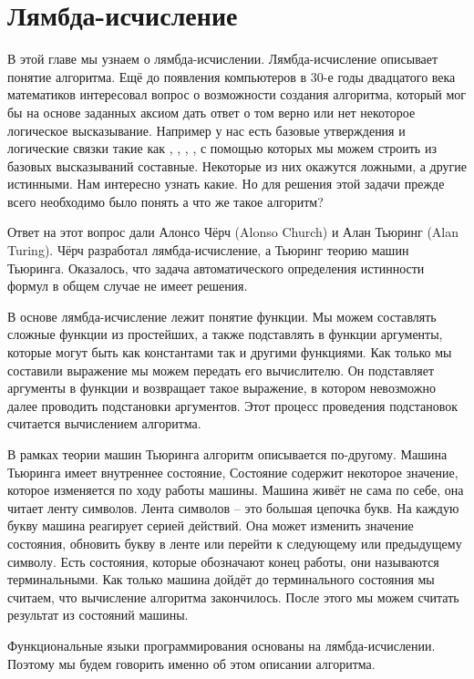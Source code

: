 \setcounter{chapter}{13}
\chapter{Лямбда-исчисление}



В этой главе мы узнаем о лямбда-исчислении. Лямбда-исчисление
описывает понятие алгоритма. 
Ещё до появления компьютеров в 30-е годы двадцатого
века математиков интересовал вопрос о возможности
создания алгоритма, который мог бы на основе заданных
аксиом дать ответ о том верно или нет некоторое 
логическое высказывание. Например у нас есть базовые утверждения
и логические связки такие как , , 
, , 
с помощью которых мы можем строить из базовых высказываний
составные. Некоторые из них окажутся ложными, а другие истинными.
Нам интересно узнать какие. Но для решения этой задачи
прежде всего необходимо было понять а что же такое 
алгоритм?

Ответ на этот вопрос дали Алонсо Чёрч (Alonso Church) и 
Алан Тьюринг (Alan Turing). Чёрч разработал лямбда-исчисление,
а Тьюринг теорию машин Тьюринга. Оказалось, что 
задача автоматического определения истинности формул
в общем случае не имеет решения. 

В основе лямбда-исчисление
лежит понятие функции. Мы можем составлять сложные функции 
из простейших, а также подставлять в функции аргументы,
которые могут быть как константами так и другими функциями.
Как только мы составили выражение мы можем передать его
вычислителю. Он подставляет аргументы в функции и
возвращает такое выражение, в котором невозможно
далее проводить подстановки аргументов. Этот процесс
проведения подстановок считается вычислением алгоритма. 

В рамках теории машин Тьюринга алгоритм описывается 
по-другому. Машина Тьюринга имеет внутреннее состояние, 
Состояние содержит некоторое значение, которое изменяется
по ходу работы машины. Машина живёт не сама по себе, она
читает ленту символов. Лента символов -- это большая цепочка
букв. На каждую букву машина реагирует серией действий.
Она может изменить значение состояния, обновить букву
в ленте или перейти к следующему или предыдущему
символу. Есть состояния, которые обозначают конец
работы, они называются терминальными. Как только машина
дойдёт до терминального состояния мы считаем, что 
вычисление алгоритма закончилось. После этого мы можем 
считать результат из состояний машины.

Функциональные языки программирования основаны на 
лямбда-исчислении. Поэтому мы будем говорить
именно об этом описании алгоритма. 

